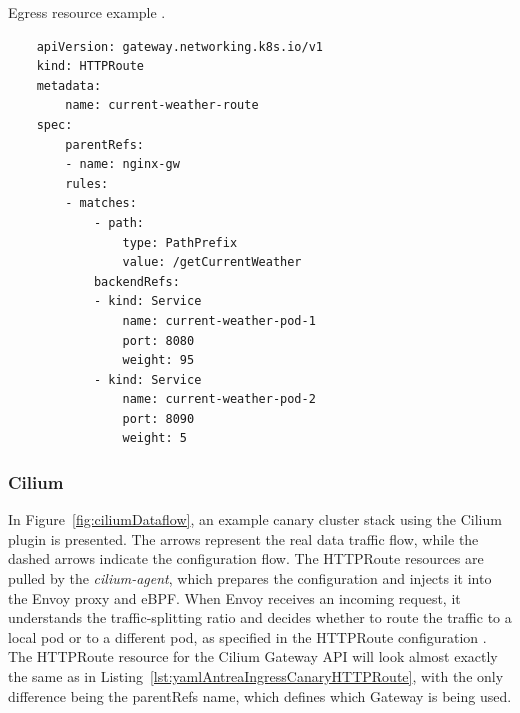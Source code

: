 \begin{listing}[htb]
    \centering
    \caption{Egress resource example \cite{AntreaDocs}.}
    \begin{verbatim}
    apiVersion: gateway.networking.k8s.io/v1
    kind: HTTPRoute
    metadata:
        name: current-weather-route
    spec:
        parentRefs:
        - name: nginx-gw
        rules:
        - matches:
            - path:
                type: PathPrefix
                value: /getCurrentWeather
            backendRefs:
            - kind: Service
                name: current-weather-pod-1
                port: 8080
                weight: 95
            - kind: Service
                name: current-weather-pod-2
                port: 8090
                weight: 5
    \end{verbatim}
    \label{lst:yamlAntreaIngressCanaryHTTPRoute}
\end{listing}

\subsubsection{Cilium}
\label{subsection:ciliumIngress}

In Figure~\ref{fig:ciliumDataflow}, an example canary cluster stack using the Cilium plugin is presented. The arrows represent the real data traffic flow, while the dashed arrows indicate the configuration flow. The HTTPRoute resources are pulled by the \textit{cilium-agent}, which prepares the configuration and injects it into the Envoy proxy and eBPF. When Envoy receives an incoming request, it understands the traffic-splitting ratio and decides whether to route the traffic to a local pod or to a different pod, as specified in the HTTPRoute configuration \cite{CiliumDocs}. The HTTPRoute resource for the Cilium Gateway API will look almost exactly the same as in Listing~\ref{lst:yamlAntreaIngressCanaryHTTPRoute}, with the only difference being the parentRefs name, which defines which Gateway is being used.


